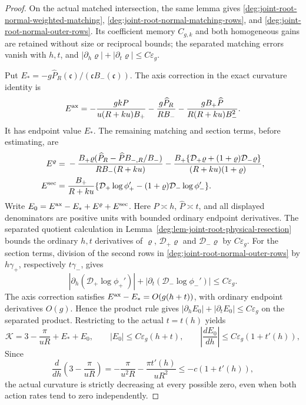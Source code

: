 \begin{proof}
On the actual matched intersection, the same lemma gives
\eqref{deg:joint-root-normal-weighted-matching},
\eqref{deg:joint-root-normal-matching-rows}, and
\eqref{deg:joint-root-normal-outer-rows}. Its coefficient memory
\(C_{g,k}\) and both homogeneous gains are retained without size
or reciprocal bounds; the separated matching errors vanish with
\(h,t\), and \(|\partial_h\varrho|+|\partial_t\varrho|\le C\varepsilon_g\).

Put \(E_*=-g\widehat P_R(\mathfrak c)/
(\mathfrak cB_-(\mathfrak c))\).
The axis correction in the exact curvature identity is
\[
 E^{\rm ax}=
 -\frac{gkP}{u(R+ku)B_+}
 -\frac{g\widehat P_R}{RB_-}
 -\frac{gB_+\widehat P}{R(R+ku)B_-^2}.
\]
It has endpoint value \(E_*\).
The remaining matching and section terms, before estimating, are
\[
 \begin{split}
 E^\varrho={}&
 -\frac{B_+\varrho(\widehat P_R-\widehat P B_{-,R}/B_-)}
                    {RB_-(R+ku)}
 -\frac{B_+\{\mathcal D_+\varrho+
                    (1+\varrho)\mathcal D_-\varrho\}}
                    {(R+ku)(1+\varrho)},\\
 E^{\rm sec}={}&
 \frac{B_+}{R+ku}
  \{\mathcal D_+\log\phi_+'-
                 (1+\varrho)\mathcal D_-\log\phi_-'\}.
 \end{split}
\]
Write \(E_0=E^{\rm ax}-E_*+E^\varrho+E^{\rm sec}\).
Here \(P\asymp h\), \(\widehat P\asymp t\), and all displayed
denominators are positive units with bounded ordinary endpoint derivatives.
The separated quotient calculation in
Lemma~\ref{deg:lem-joint-root-physical-resection} bounds the ordinary
\(h,t\) derivatives of \(\varrho\), \(\mathcal D_+\varrho\)
and \(\mathcal D_-\varrho\) by \(C\varepsilon_g\).
For the section terms, division of the second rows in
\eqref{deg:joint-root-normal-outer-rows} by
\(h\gamma_+\), respectively \(t\gamma_-\), gives
\[
 |\partial_h(\mathcal D_+\log\phi_+')|
 +|\partial_t(\mathcal D_-\log\phi_-')|
 \le C\varepsilon_g .
\]
The axis correction satisfies
\(E^{\rm ax}-E_*=O(g(h+t))\), with ordinary endpoint derivatives
\(O(g)\). Hence the product rule gives
\( |\partial_hE_0|+|\partial_tE_0|\le C\varepsilon_g\)
on the separated product. Restricting to the actual \(t=t(h)\) yields
\begin{equation}
 \mathscr K=3-\frac{\pi}{uR}+E_*+E_0,\qquad
 |E_0|\le C\varepsilon_g(h+t),\qquad
 \left|\frac{dE_0}{dh}\right|
       \le C\varepsilon_g(1+t'(h)),
 \label{deg:quadratic-normal-curvature}
\end{equation}
Since
\[
 \frac{d}{dh}\left(3-\frac{\pi}{uR}\right)
 =-\frac{\pi}{u^2R}
  -\frac{\pi t'(h)}{uR^2}
 \le-c(1+t'(h)),
\]
the actual curvature is strictly decreasing at every possible zero,
even when both action rates tend to zero independently.


\end{proof}
